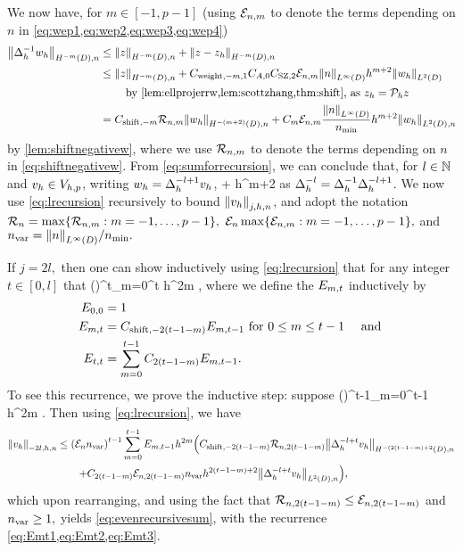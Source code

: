 We now have, for $m \in [-1,p-1]$ (using $\mathcal E_{n,m}$ to denote the terms depending on $n$ in \cref{eq:wep1,eq:wep2,eq:wep3,eq:wep4})
\begin{align}
\NHnfn{-m}{D}{\DeltahI \wh} &\leq \NHnfn{-m}{D}{z} + \NHnfn{-m}{D}{z-\zh}\nonumber\\
&\leq \NHnfn{-m}{D}{z} + \Cwfn{-m,1}  \CAfn{0} \CSZfn{2} \errn{m} \NLiD{n} h^{m+2} \NLtD{\wh}\nonumber\\
&\quad\quad\text{ by \cref{lem:ellprojerrw,lem:scottzhang,thm:shift}, as }\zh = \Ph z\nonumber\\
&= \Cshiftfn{m} \shiftn{m} \NHnfn{-(m+2)}{D}{\wh} + \Cm \errn{m} \frac{\NLiD{n}}{\nmin} h^{m+2} \NLtDn{\wh}\label{eq:sumforrecursion}
\end{align}
by \cref{lem:shiftnegativew}, where we use $\mathcal R_{n,m}$ to denote the terms depending on $n$ in \cref{eq:shiftnegativew}.
From \cref{eq:sumforrecursion}, we can conclude that, for $l \in \mathbb N$ and $v_{h} \in V_{h,p}$, writing $w_{h} = \Delta_{h}^{-l+1} v_{h}$,
\beq\label{eq:lrecursion}
 \leq {}  + \Cm {}  h^{m+2} \NLtDn{\Deltahmlpo \vh}
\eeq
as $\Delta_{h}^{-l} = \Delta_{h}^{-1} \Delta_{h}^{-l+1}$. We now use \cref{eq:lrecursion} recursively to bound $\Nfn{j,h,n}{\vh}$, and adopt the notation $\Rn = \max\set{\shiftn{m}\st m = -1,\ldots,p-1},$ $\En\max\set{\errn{m}\st m = -1,\ldots,p-1},$ and $\nvar = \NLiD{n}/\nmin.$

If $j = 2l,$ then one can show inductively using \cref{eq:lrecursion} that for any integer $t \in [0,l]$ that
\beq\label{eq:evenrecursivesum}
 \leq \mleft(\En\nvar\mright)^t\sum_{m=0}^t  h^{2m}  ,
\eeq
where we define the $E_{m,t}$ inductively by
\begin{align}
\label{eq:Emt1}E_{0,0} &=1\\
\label{eq:Emt2}E_{m,t} &= C_{\mathrm{shift},-2(t-1-m)} E_{m,t-1} \text{ for } 0 \leq m \leq t-1 \quad\text{ and }\\
\label{eq:Emt3}E_{t,t} &= \sum_{m=0}^{t-1} C_{2(t-1-m)} E_{m,t-1}.
\end{align}
To see this recurrence, we prove the inductive step: suppose
\beqs
{} \leq \mleft(\En\nvar\mright)^{t-1}\sum_{m=0}^{t-1}  h^{2m} .
\eeqs
Then using \cref{eq:lrecursion}, we have
\begin{align*}
\Nfn{-2l,h,n}{\vh} &\leq \mleft(\En\nvar\mright)^{t-1}\sum_{m=0}^{t-1} \Efn{m,t-1} h^{2m} \mleft(\Cshiftfn{2(t-1-m)}\shiftn{2(t-1-m)} \NHnfn{-(2(t-1-m)+2}{D}{\Deltah^{-l+t} \vh}\mright.\\
&\quad\quad\mleft.+ \Cfn{2(t-1-m)} \errn{2(t-1-m)} \nvar h^{2(t-1-m)+2} \NLtDn{\Deltah^{-l+t} \vh}\mright),
\end{align*}
which upon rearranging, and using the fact that $\mathcal R_{n,2(t-1-m)} \leq \mathcal E_{n,2(t-1-m)}$ and $n_{\mathrm{var}} \geq 1,$ yields \cref{eq:evenrecursivesum}, with the recurrence \cref{eq:Emt1,eq:Emt2,eq:Emt3}.

